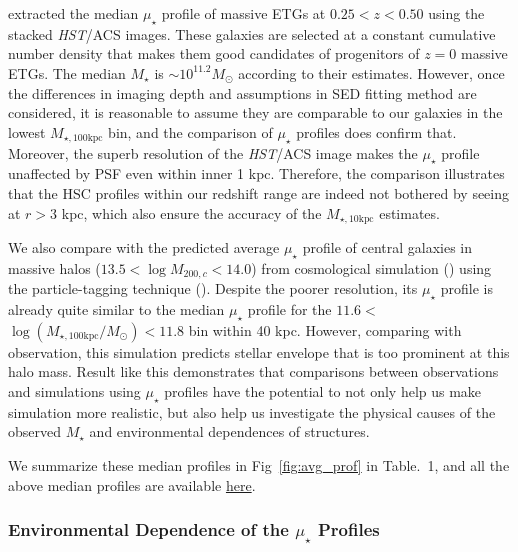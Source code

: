 \documentclass{emulateapj}
\def\mstar{{$M_{\star}$}}
\def\minn{{$M_{\star,10\mathrm{kpc}}$}}
\def\mtot{{$M_{\star,100\mathrm{kpc}}$}}
\def\logmtot{{$\log (M_{\star,100\mathrm{kpc}}/M_{\odot})$}}
\def\mden{{$\mu_{\star}$}}
\begin{document}
\begin{CJK*}{UTF8}{gbsn}
    \citet{Patel2013} extracted the median \mden{} profile of massive ETGs at 
    $0.25 < z < 0.50$ using the stacked \textit{HST}/ACS images. 
    These galaxies are selected at a constant cumulative number density that makes them  
    good candidates of progenitors of $z=0$ massive ETGs.  
    The median \mstar{} is $\sim 10^{11.2} M_{\odot}$ according to their estimates.  
    However, once the differences in imaging depth and assumptions in SED fitting method
    are considered, it is reasonable to assume they are comparable to our galaxies in 
    the lowest \mtot{} bin, and the comparison of \mden{} profiles does confirm that.
    Moreover, the superb resolution of the \textit{HST}/ACS image makes the \mden{} 
    profile unaffected by PSF even within inner 1 kpc.
    Therefore, the comparison illustrates that the HSC profiles within our redshift
    range are indeed not bothered by seeing at $r > 3$ kpc, which also ensure the
    accuracy of the \minn{} estimates.
  
    We also compare with the predicted average \mden{} profile of central galaxies in 
    massive halos ($13.5 < \log M_{200,c} < 14.0$) from cosmological simulation
    (\citealt{Cooper13}) using the particle-tagging technique (\citealt{Cooper10}).
    Despite the poorer resolution, its \mden{} profile is already quite similar to 
    the median \mden{} profile for the $11.6 <$\logmtot{}$< 11.8$ bin within 40 kpc. 
    However, comparing with observation, this simulation predicts stellar envelope that
    is too prominent at this halo mass.
    Result like this demonstrates that comparisons between observations and simulations
    using \mden{} profiles have the potential to not only help us make simulation
    more realistic, but also help us investigate the physical causes of the observed
    \mstar{} and environmental dependences of structures.
    
    We summarize these median profiles in Fig~\ref{fig:avg_prof} in Table.~1,
    and all the above median profiles are available  
    \href{https://github.com/dr-guangtou/hsc_cenHighMh/tree/master/profiles}{here}.

\subsubsection{Environmental Dependence of the \mden{} Profiles}
    \label{sssec:sbp_mtot}    
    

\end{CJK*}
\end{document}
